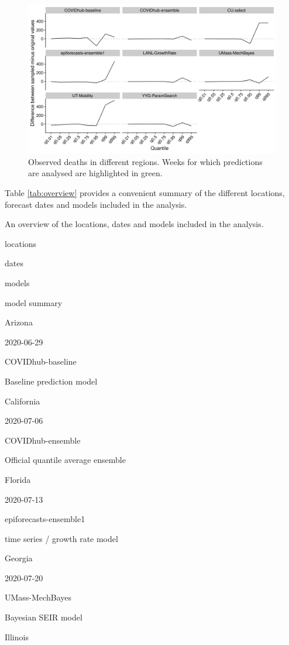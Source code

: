 \documentclass[
]{book}
\begin{document}
\begin{figure}
\includegraphics[width=0.95\linewidth]{../visualisation/chapter-4-ensemble/difference-true-sampled} \caption{Observed deaths in different regions. Weeks for which predictions are analysed are highlighted in green.}\label{fig:difference-true-sampled}
\end{figure}

Table \ref{tab:overview} provides a convenient summary of the different locations, forecast dates and models included in the analysis.

\label{tab:overview}An overview of the locations, dates and models included in the analysis.

locations

dates

models

model summary

Arizona

2020-06-29

COVIDhub-baseline

Baseline prediction model

California

2020-07-06

COVIDhub-ensemble

Official quantile average ensemble

Florida

2020-07-13

epiforecasts-ensemble1

time series / growth rate model

Georgia

2020-07-20

UMass-MechBayes

Bayesian SEIR model

Illinois
\end{document}
